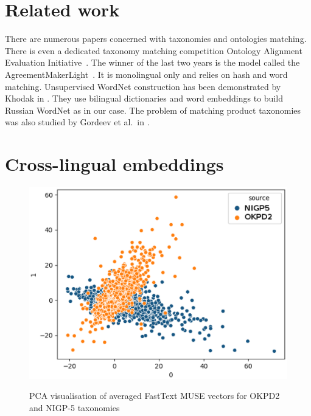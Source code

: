 \documentclass[11pt,a4paper]{article}
\begin{document}
\section{Related work}
There are numerous papers concerned with taxonomies and ontologies matching. There is even a dedicated taxonomy matching competition Ontology Alignment Evaluation Initiative~\cite{ontology-sota}. The winner of the last two years is the model called the AgreementMakerLight~\cite{faria}. It is monolingual only and relies on hash and word matching. Unsupervised WordNet construction has been demonstrated by Khodak in \citeyearpar{Khodak2017}. They use bilingual dictionaries and word embeddings to build Russian WordNet as in our case. The problem of matching product taxonomies was also studied by Gordeev et al.\ in \citeyearpar{gordeev-fruct}.

\section{Cross-lingual embeddings}

\begin{figure}

	\centering
	\small
	\includegraphics[scale=0.5]{tsne_new}\\

	\caption{PCA visualisation of averaged FastText MUSE vectors for OKPD2 and NIGP-5 taxonomies}
	\label{original-doc2vec}
\end{figure}
\end{document}
